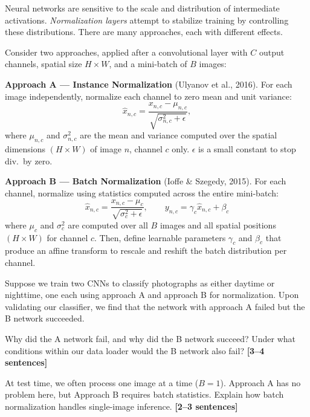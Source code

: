 \documentclass{csci1430}
\begin{document}
\begin{question}[points=8,drawbox=false]
Neural networks are sensitive to the scale and distribution of intermediate activations. \emph{Normalization layers} attempt to stabilize training by controlling these distributions. There are many approaches, each with different effects.

Consider two approaches, applied after a convolutional layer with $C$ output channels, spatial size $H \times W$, and a mini-batch of $B$ images:

\textbf{Approach A --- Instance Normalization} (Ulyanov et al., 2016). For each image independently, normalize each channel to zero mean and unit variance:
\[
\hat{x}_{n,c} = \frac{x_{n,c} - \mu_{n,c}}{\sqrt{\sigma_{n,c}^2 + \epsilon}},
\]
where $\mu_{n,c}$ and $\sigma_{n,c}^2$ are the mean and variance computed over the spatial dimensions $(H \times W)$ of image $n$, channel $c$ only. $\epsilon$ is a small constant to stop div.~by zero.

\textbf{Approach B --- Batch Normalization} (Ioffe \& Szegedy, 2015). For each channel, normalize using statistics computed across the entire mini-batch:
\[
\hat{x}_{n,c} = \frac{x_{n,c} - \mu_c}{\sqrt{\sigma_c^2 + \epsilon}}, \qquad y_{n,c} = \gamma_c \hat{x}_{n,c} + \beta_c
\]
where $\mu_c$ and $\sigma_c^2$ are computed over all $B$ images and all spatial positions $(H \times W)$ for channel $c$. Then, define learnable parameters $\gamma_c$ and $\beta_c$ that produce an affine transform to rescale and reshift the batch distribution per channel. \end{question}

\begin{subquestion}[points=3]
Suppose we train two CNNs to classify photographs as either daytime or nighttime, one each using approach A and approach B for normalization. Upon validating our classifier, we find that the network with approach A failed but the B network succeeded.

Why did the A network fail, and why did the B network succeed? Under what conditions within our data loader would the B network also fail? \textbf{[3--4 sentences]}
\end{subquestion}

\begin{answer}[height=12]

\end{answer}

\pagebreak
\begin{subquestion}[points=2]
At test time, we often process one image at a time ($B = 1$). Approach A has no problem here, but Approach B requires batch statistics. Explain how batch normalization handles single-image inference. \textbf{[2--3 sentences]}
\end{subquestion}
\end{document}
